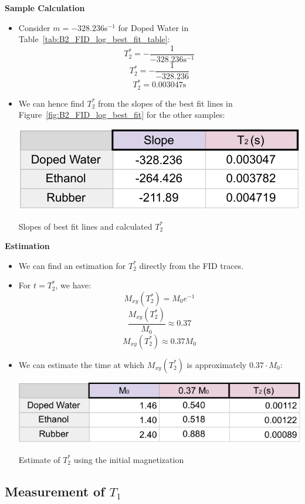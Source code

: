 \documentclass{article}
\begin{document}
\textbf{Sample Calculation}
\begin{itemize}
    \item Consider $m = -328.236$s$^{-1}$ for Doped Water in Table~\ref{tab:B2_FID_log_best_fit_table}:
    \[ T_2^* = -\frac{1}{-328.236\text{s}^{-1}} \]
    \[ T_2^* = -\frac{1}{-328.236}\]
    \[ T_2^* = 0.003047\text{s} \]
    \item We can hence find $T_2^*$ from the slopes of the best fit lines in Figure~\ref{fig:B2_FID_log_best_fit} for the other samples:
    \begin{table}[h]
        \centering
        \includegraphics[scale = 0.78]{../images/B2_T2-crop}
        \caption{Slopes of best fit lines and calculated $T_2^*$}
        \label{tab:B2_FID_log_best_fit_table}
    \end{table}
\end{itemize}
\textbf{Estimation}
\begin{itemize}
    \item We can find an estimation for $T_2^*$ directly from the FID traces.
    \item For $t = T_2^*$, we have:
    \[ M_{xy}(T_2^*) = M_0 e^{-1} \]
    \[ \frac{M_{xy}(T_2^*)}{M_0} \approx 0.37 \]
    \[ M_{xy}(T_2^*) \approx 0.37 M_0 \]
    \item We can estimate the time at which $M_{xy}(T_2^*)$ is approximately $0.37 \cdot M_0$:
    \begin{table}[h]
        \centering
        \includegraphics[scale = 0.78]{../images/B2_slopes_estimate-crop}
        \caption{Estimate of $T_2^*$ using the initial magnetization}
        \label{tab:B2_FID_log_best_fit_table_estimate}
    \end{table}
\end{itemize}

\subsection{Measurement of $T_1$}\label{subsec:measurement-of-$t_1$}
\end{document}
